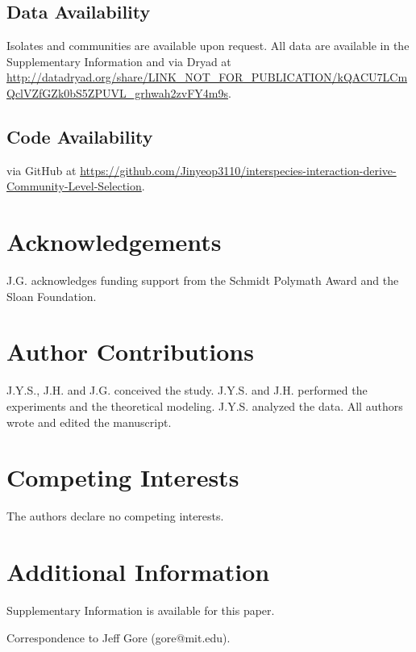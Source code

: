 \subsection*{Data Availability}
\label{sec:methods:data}

Isolates and communities are available upon request. All data are available in the Supplementary Information and via Dryad at \url{http://datadryad.org/share/LINK_NOT_FOR_PUBLICATION/kQACU7LCmQclVZfGZk0bS5ZPUVL_grhwah2zvFY4m9s}.


\subsection*{Code Availability}
\label{sec:methods:code}

 via GitHub at \url{https://github.com/Jinyeop3110/interspecies-interaction-derive-Community-Level-Selection}.



\section*{Acknowledgements}
\label{sec:acknowledgements}

J.G. acknowledges funding support from the Schmidt Polymath Award and the Sloan Foundation.


\section*{Author Contributions}
\label{sec:contributions}

J.Y.S., J.H. and J.G. conceived the study. J.Y.S. and J.H. performed the experiments and the theoretical modeling. J.Y.S. analyzed the data. All authors wrote and edited the manuscript.


\section*{Competing Interests}
\label{sec:competing}

The authors declare no competing interests.


\section*{Additional Information}
\label{sec:additional}

Supplementary Information is available for this paper.

\noindent Correspondence to Jeff Gore (gore@mit.edu).
